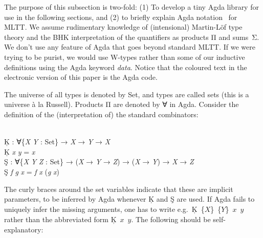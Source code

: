 \documentclass{entcs} \usepackage{prentcsmacro}
\newcommand{\AgdaC}[1]{\mbox{#1}}
\newcommand{\AgdaFontStyle}[1]{\textsf{#1}}
\newcommand{\AgdaBoundFontStyle}[1]{\textit{#1}}
\newcommand{\AgdaKeyword}     [1]
    {\AgdaFontStyle{\textcolor{AgdaKeyword}{#1}}}
\newcommand{\AgdaSymbol}      [1]{\textcolor{AgdaSymbol}{#1}}
\newcommand{\AgdaPrimitiveType}[1]
    {\AgdaFontStyle{\textcolor{AgdaPrimitiveType}{#1}}}
\newcommand{\AgdaBound}    [1]{\AgdaBoundFontStyle{\textcolor{AgdaBound}{#1}}}
\newcommand{\AgdaFunction} [1]{\AgdaFontStyle{\textcolor{AgdaFunction}{#1}}}
\newcommand{\AgdaModule}   [1]{\AgdaFontStyle{\textcolor{AgdaModule}{#1}}}
\newcommand{\AgdaCodeStyle}{\small}
\newenvironment{code}%
{\noindent\AgdaCodeStyle\pboxed}%
{\endpboxed\par\noindent%
\ignorespacesafterend}
\begin{document}
The purpose of this subsection is two-fold: (1) To develop a tiny Agda
library for use in the following sections, and (2) to briefly explain
Agda notation~\cite{bove:dybjer} for MLTT. We assume rudimentary
knowledge of (intensional) Martin-L\"of type theory and the BHK
interpretation of the quantifiers as products Π and sums~Σ. We don't
use any feature of Agda that goes beyond standard MLTT. If we were
trying to be purist, we would use W-types rather than some of our
inductive definitions using the Agda keyword \emph{data}. Notice that
the coloured text in the electronic version of this paper is the Agda
code.

The universe of all types is denoted by Set, and types are called
sets (this is a universe \`a la Russell).  Products \AgdaC{Π} are
denoted by \AgdaC{∀} in Agda. 
\AgdaHide{ %
\begin{code}\>\<%
\\
\>\AgdaKeyword{module} \AgdaModule{dialogue} \AgdaKeyword{where}\<%
\\
\>\<\end{code}
}
Consider the definition of the (interpretation of) the standard
combinators:

\begin{code}\>\<%
\\
\>\AgdaFunction{Ķ} \AgdaSymbol{:} \AgdaSymbol{∀\{}\AgdaBound{X} \AgdaBound{Y} \AgdaSymbol{:} \AgdaPrimitiveType{Set}\AgdaSymbol{\}} \AgdaSymbol{→} \AgdaBound{X} \AgdaSymbol{→} \AgdaBound{Y} \AgdaSymbol{→} \AgdaBound{X}\<%
\\
\>\AgdaFunction{Ķ} \AgdaBound{x} \AgdaBound{y} \AgdaSymbol{=} \AgdaBound{x}\<%
\\
\>\AgdaFunction{Ş} \AgdaSymbol{:} \AgdaSymbol{∀\{}\AgdaBound{X} \AgdaBound{Y} \AgdaBound{Z} \AgdaSymbol{:} \AgdaPrimitiveType{Set}\AgdaSymbol{\}} \AgdaSymbol{→} \AgdaSymbol{(}\AgdaBound{X} \AgdaSymbol{→} \AgdaBound{Y} \AgdaSymbol{→} \AgdaBound{Z}\AgdaSymbol{)} \AgdaSymbol{→} \AgdaSymbol{(}\AgdaBound{X} \AgdaSymbol{→} \AgdaBound{Y}\AgdaSymbol{)} \AgdaSymbol{→} \AgdaBound{X} \AgdaSymbol{→} \AgdaBound{Z}\<%
\\
\>\AgdaFunction{Ş} \AgdaBound{f} \AgdaBound{g} \AgdaBound{x} \AgdaSymbol{=} \AgdaBound{f} \AgdaBound{x} \AgdaSymbol{(}\AgdaBound{g} \AgdaBound{x}\AgdaSymbol{)}\<%
\\
\>\<\end{code}
  The curly braces around the set variables indicate that these are
implicit parameters, to be inferred by Agda whenever \AgdaC{Ķ} and \AgdaC{Ş} are
used. If Agda fails to uniquely infer the missing arguments, one has
to write e.g.\ \AgdaC{$Ķ$ \{$X$\} \{$Y$\} $x$ $y$} rather than the
abbreviated form \AgdaC{$Ķ$ $x$ $y$}. The following should be
self-explanatory:
\end{document}

